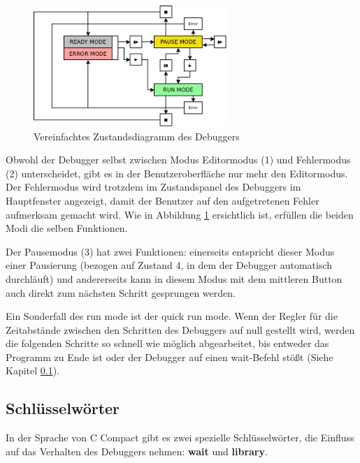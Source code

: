 \begin{figure}[htp]
\centering
\includegraphics[width=0.65\textwidth]{./media/images/gui/debugger/RunModes_Simple.png}
\caption{Vereinfachtes Zustandsdiagramm des Debuggers}
\label{fig:deb-zust-simple}
\end{figure}

Obwohl der Debugger selbst zwischen Modus Editormodus (1) und Fehlermodus (2) unterscheidet, gibt es in der Benutzeroberfläche nur mehr den Editormodus. Der Fehlermodus wird trotzdem im Zustandspanel des Debuggers im Hauptfenster angezeigt, damit der Benutzer auf den aufgetretenen Fehler aufmerksam gemacht wird. Wie in Abbildung \ref{fig:deb-zust-simple} ersichtlich ist, erfüllen die beiden Modi die selben Funktionen.

Der Pausemodus (3) hat zwei Funktionen: einerseits entspricht dieser Modus einer Pausierung (bezogen auf Zustand 4, in dem der Debugger automatisch durchläuft) und andererseits kann in diesem Modus mit dem mittleren Button auch direkt zum nächsten Schritt gesprungen werden.

Ein Sonderfall des run mode ist der \glqq{}quick run mode\grqq{}. Wenn der Regler für die Zeitabstände zwischen den Schritten des Debuggers auf null gestellt wird, werden die folgenden Schritte so schnell wie möglich abgearbeitet, bis entweder das Programm zu Ende ist oder der Debugger auf einen \glqq{}wait\grqq{}-Befehl stößt (Siehe Kapitel \ref{}).



\subsection{Schlüsselwörter}
In der Sprache von C Compact gibt es zwei spezielle Schlüsselwörter, die Einfluss auf das Verhalten des Debuggers nehmen: \textbf{wait} und \textbf{library}.

